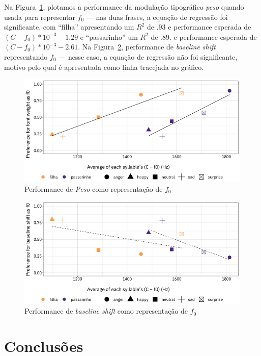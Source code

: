 \documentclass[11pt]{article}
\begin{document}
  Na Figura~\ref{fig:font_weight_as_f0}, plotamos a performance da modulação tipográfico {\itshape peso} quando usada para representar $f_0$ --- nas duas frases, a equação de regressão foi significante, com ``filha'' apresentando um $R^2$ de .93 e performance esperada de $(C-f_0) * 10^{-3} - 1.29$ e ``passarinho'' um $R^2$ de .89. e performance esperada de $(C-f_0) * 10^{-3} - 2.61$. Na Figura~\ref{fig:baseline_shift_as_f0}, performance de {\itshape baseline shift} representando $f_0$ --- nesse caso, a equação de regressão não foi significante, motivo pelo qual é apresentada como linha tracejada no gráfico.
  
\begin{figure}[H]
     {\centering
\includegraphics[width=\linewidth]{fig/font_weight_as_pitch.png}
     \caption{Performance de {\itshape Peso} como representação de $f_0$}
     \label{fig:font_weight_as_f0}\par}
\end{figure}

\begin{figure}[H]
     {\centering
\includegraphics[width=\linewidth]{fig/baseline_shift_as_pitch.png}
     \caption{Performance de {\itshape baseline shift} como representação de $f_0$}
     \label{fig:baseline_shift_as_f0}\par}
\end{figure}

\section{Conclus\~{o}es}
  \label{sec:conclusoes}

  

   
\end{document}
